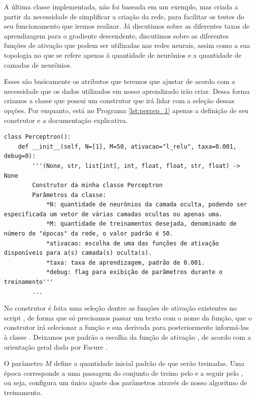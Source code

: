 A última classe implementada, não foi baseada em um exemplo, mas criada a partir da necessidade de simplificar a criação da rede, para facilitar os testes do seu funcionamento que iremos realizar. Já discutimos sobre as diferentes taxas de aprendizagem para o gradiente descendente, discutimos sobre as diferentes funções de ativação que podem ser utilizadas nas redes neurais, assim como a sua topologia no que se refere apenas à quantidade de neurônios e a quantidade de camadas de neurônios.

Esses são basicamente os atributos que teremos que ajustar de acordo com a necessidade que os dados utilizados em nosso aprendizado irão criar. Dessa forma criamos a classe  que possui um construtor que irá lidar com a seleção dessas opções. Por enquanto, está no Programa \ref{lst:percep_1} apenas a definição de seu construtor e a documentação explicativa.
\newline
\estiloR
\begin{lstlisting}[caption={Trecho da classe \eng{Perceptron}}, label={lst:percep_1}, escapeinside={\%}]
class Perceptron():
    def __init__(self, N=[1], M=50, ativacao="l_relu", taxa=0.001, debug=0):
	    '''(None, str, list[int], int, float, float, str, float) -> None
	    Construtor da minha classe Perceptron
	    Parâmetros da classe:
	    	*N: quantidade de neurônios da camada oculta, podendo ser especificada um vetor de várias camadas ocultas ou apenas uma.
	    	*M: quantidade de treinamentos desejada, denominado de número de "épocas" da rede, o valor padrão é 50.
	    	*ativacao: escolha de uma das funções de ativação disponíveis para a(s) camada(s) oculta(s).
	    	*taxa: taxa de aprendizagem, padrão de 0.001.
	    	*debug: flag para exibição de parâmetros durante o treinamento'''
	    ...
\end{lstlisting}

No construtor é feita uma seleção dentre as funções de ativação existentes no script , de forma que só precisamos passar um texto com o nome da função, que o construtor irá selecionar a função e sua derivada para posteriormente informá-las à classe . Deixamos por padrão a escolha da função de ativação , de acordo com a orientação geral dada por Facure \citep{matheus}.

O parâmetro $M$ define a quantidade inicial padrão de  que serão treinadas. Uma época corresponde a uma passagem do conjunto de treino pelo  e a seguir pelo , ou seja, configura um único ajuste dos parâmetros através de nosso algoritmo de treinamento.


